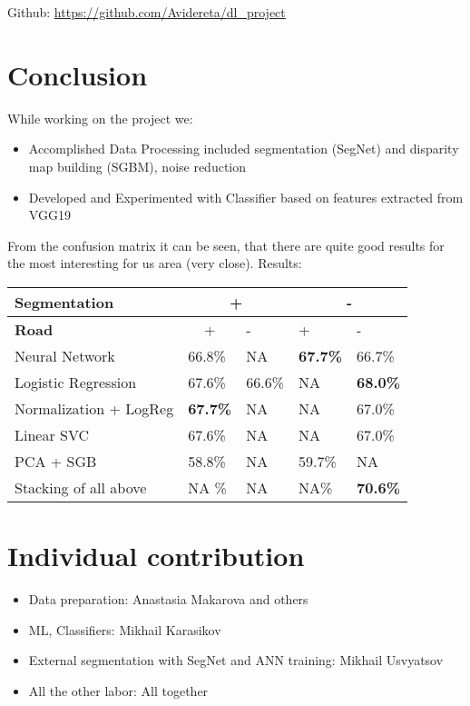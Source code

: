 \documentclass{article}
\begin{document}
    Github: \url{https://github.com/Avidereta/dl_project}

    \section{Conclusion}\label{conclusion}
While working on the project we:
	\begin{itemize}
		\item Accomplished Data Processing included segmentation (SegNet) and disparity map building (SGBM), noise reduction
		\item Developed and Experimented with Classifier based on features extracted from VGG19 
	\end{itemize}
	From the confusion matrix it can be seen, that there are quite good results for the most interesting for us area (very close). 
	Results:

    \begin{table}
    \begin{tabular}{|l|l|l|l|l|} 
    \hline 
    \textbf{Segmentation }& \multicolumn{2}{c|}{+} & \multicolumn{2}{c|}{-} \\ 
    \hline 
    \textbf{Road} & \multicolumn{1}{c|}{+} & - & + & - \\ 
    \hline 
    Neural Network & 66.8\% & NA & \textbf{67.7\%} & 66.7\% \\ 
    \hline 
    Logistic Regression & 67.6\% & 66.6\% & NA & \textbf{68.0\%} \\ 
    \hline 
    Normalization + LogReg & \textbf{67.7\%} & NA & NA & 67.0\% \\ 
    \hline 
    Linear SVC & 67.6\% & NA & NA & 67.0\% \\ 
    \hline 
    PCA + SGB & 58.8\% & NA & 59.7\% & NA \\ 
    \hline 
    Stacking of all above & NA \% & NA & NA\% & \textbf{70.6\%} \\ 
    \hline 
    \end{tabular}
    \end{table}

    \newpage
    \section{Individual contribution} 
    \begin{itemize} 
      \item Data preparation: Anastasia Makarova and others 
      \item ML, Classifiers: Mikhail Karasikov 
      \item External segmentation with SegNet and ANN training: Mikhail Usvyatsov 
      \item All the other labor: All together
    \end{itemize}


    
    
    
    
\end{document}
